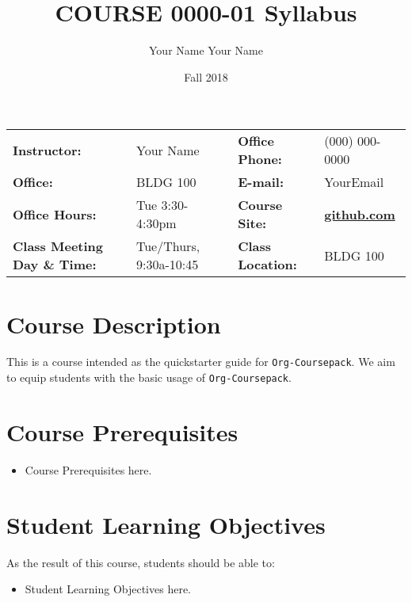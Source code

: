 \documentclass[article,letterpaper,times,10pt,listings-bw,microtype]{scrartcl}
\author{Your Name Your Name}
\date{Fall 2018}
\title{COURSE 0000-01 Syllabus}
\begin{document}

\begin{center}
{}
\end{center}

\begin{center}
{}
\end{center}

\vspace{5 mm}

\begin{center}
\begin{tabular}{llll}
\textbf{Instructor:} & Your Name & \textbf{Office Phone:} & (000) 000-0000\\
\textbf{Office:} & BLDG 100 & \textbf{E-mail:} & YourEmail\\
\textbf{Office Hours:} & Tue 3:30-4:30pm & \textbf{Course Site:} & \textbf{\href{https://github.com}{github.com}}\\
\textbf{Class Meeting Day \& Time:} & Tue/Thurs, 9:30a-10:45 & \textbf{Class Location:} & BLDG 100\\
\end{tabular}
\end{center}
\section*{Course Description}
\label{sec:orgba742b8}
This is a course intended as the quickstarter guide for \texttt{Org-Coursepack}. We
aim to equip students with the basic usage of \texttt{Org-Coursepack}.
\section*{Course Prerequisites}
\label{sec:org4c7a1f4}
\begin{itemize}
\item Course Prerequisites here.
\end{itemize}
\section*{Student Learning Objectives}
\label{sec:org19b521a}
As the result of this course, students should be able to:

\begin{itemize}
\item Student Learning Objectives here.
\end{itemize}
\end{document}
